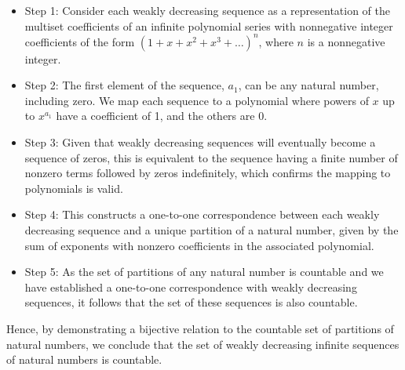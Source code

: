 \documentclass[letterpaper,12pt]{article}
\begin{document}
\begin{itemize}
    \item Step 1: Consider each weakly decreasing sequence as a representation of the multiset coefficients of an infinite polynomial series with nonnegative integer coefficients of the form \((1 + x + x^2 + x^3 + \ldots)^n\), where \(n\) is a nonnegative integer.

    \item Step 2: The first element of the sequence, \(a_1\), can be any natural number, including zero. We map each sequence to a polynomial where powers of \(x\) up to \(x^{a_1}\) have a coefficient of 1, and the others are 0.

    \item Step 3: Given that weakly decreasing sequences will eventually become a sequence of zeros, this is equivalent to the sequence having a finite number of nonzero terms followed by zeros indefinitely, which confirms the mapping to polynomials is valid. 

    \item Step 4: This constructs a one-to-one correspondence between each weakly decreasing sequence and a unique partition of a natural number, given by the sum of exponents with nonzero coefficients in the associated polynomial.

    \item Step 5: As the set of partitions of any natural number is countable and we have established a one-to-one correspondence with weakly decreasing sequences, it follows that the set of these sequences is also countable.
\end{itemize}

Hence, by demonstrating a bijective relation to the countable set of partitions of natural numbers, we conclude that the set of weakly decreasing infinite sequences of natural numbers is countable.
\end{document}
